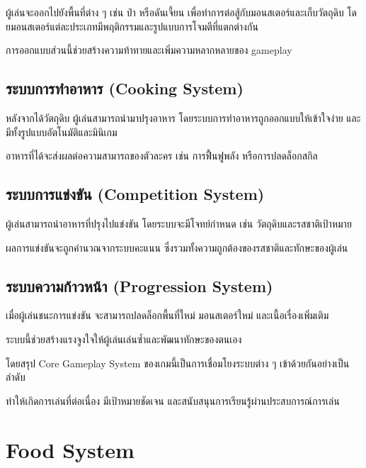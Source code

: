 ผู้เล่นจะออกไปยังพื้นที่ต่าง ๆ เช่น ป่า หรือดันเจี้ยน เพื่อทำการต่อสู้กับมอนสเตอร์และเก็บวัตถุดิบ โดยมอนสเตอร์แต่ละประเภทมีพฤติกรรมและรูปแบบการโจมตีที่แตกต่างกัน
\par\vspace{1em}\noindent
การออกแบบส่วนนี้ช่วยสร้างความท้าทายและเพิ่มความหลากหลายของ gameplay


\subsection{ระบบการทำอาหาร (Cooking System)}

หลังจากได้วัตถุดิบ ผู้เล่นสามารถนำมาปรุงอาหาร โดยระบบการทำอาหารถูกออกแบบให้เข้าใจง่าย และมีทั้งรูปแบบอัตโนมัติและมินิเกม 
\par\vspace{1em}\noindent
อาหารที่ได้จะส่งผลต่อความสามารถของตัวละคร เช่น การฟื้นฟูพลัง หรือการปลดล็อกสกิล

\subsection{ระบบการแข่งขัน (Competition System)}

ผู้เล่นสามารถนำอาหารที่ปรุงไปแข่งขัน โดยระบบจะมีโจทย์กำหนด เช่น วัตถุดิบและรสชาติเป้าหมาย
\par\vspace{1em}\noindent
ผลการแข่งขันจะถูกคำนวณจากระบบคะแนน ซึ่งรวมทั้งความถูกต้องของรสชาติและทักษะของผู้เล่น

\subsection{ระบบความก้าวหน้า (Progression System)}

เมื่อผู้เล่นชนะการแข่งขัน จะสามารถปลดล็อกพื้นที่ใหม่ มอนสเตอร์ใหม่ และเนื้อเรื่องเพิ่มเติม
\par\vspace{1em}\noindent
ระบบนี้ช่วยสร้างแรงจูงใจให้ผู้เล่นเล่นซ้ำและพัฒนาทักษะของตนเอง
\par\vspace{1em}\noindent
โดยสรุป Core Gameplay System ของเกมนี้เป็นการเชื่อมโยงระบบต่าง ๆ เข้าด้วยกันอย่างเป็นลำดับ \par
\noindent ทำให้เกิดการเล่นที่ต่อเนื่อง มีเป้าหมายชัดเจน และสนับสนุนการเรียนรู้ผ่านประสบการณ์การเล่น

\section{Food System}


